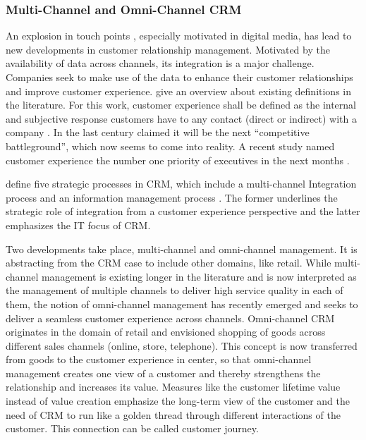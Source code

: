 	\subsubsection{Multi-Channel and Omni-Channel CRM}
		An explosion in touch points \cite{Lemon_2016}, especially motivated in digital media, has lead to new developments in customer relationship management. Motivated by the availability of data across channels, its integration is a major challenge. Companies seek to make use of the data to enhance their customer relationships and improve customer experience. \citeauthor{Lemon_2016} give an overview about existing definitions in the literature. For this work, customer experience shall be defined as the internal and subjective response customers have to any contact (direct or indirect) with a company \cite{meyer2007customer}. In the last century \citeauthor{gilmore1998} claimed it will be the next \enquote{competitive battleground}, which now seems to come into reality. A recent study named customer experience the number one priority of executives in the next months \cite{acc2015ce}.
		
		\citeauthor{payne2004role} define five strategic processes in \acrshort{CRM}, which include a multi-channel Integration process and an information management process \cite{payne2004role}. The former underlines the strategic role of integration from a customer experience perspective and the latter emphasizes the IT focus of CRM. 
		
		Two developments take place, multi-channel and omni-channel management. It is abstracting from the CRM case to include other domains, like retail. While multi-channel management is existing longer in the literature and is now interpreted as the management of multiple channels to deliver high service quality in each of them, the notion of omni-channel management has recently emerged and seeks to deliver a seamless customer experience across channels. Omni-channel CRM originates in the domain of retail \cite{Brynjolfsson20131, rigby2011} and envisioned shopping of goods across different sales channels (\ie online, store, telephone). This concept is now transferred from goods to the customer experience in center, so that omni-channel management creates one view of a customer and thereby strengthens the relationship and increases its value. Measures like the customer lifetime value instead of value creation emphasize the long-term view of the customer \cite{Lemon_2016} and the need of CRM to run like a golden thread through different interactions of the customer. This connection can be called customer journey. 
		
